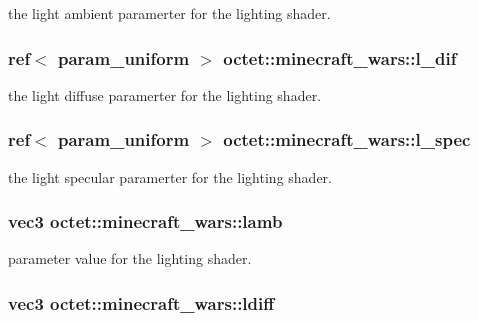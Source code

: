 the light ambient paramerter for the lighting shader. 

\hypertarget{classoctet_1_1minecraft__wars_ac4e627b56678402ff9581a24725d17c0}{
\subsubsection[{l\+\_\+dif}]{\setlength{\rightskip}{0pt plus 5cm}ref$<$ param\+\_\+uniform $>$ octet\+::minecraft\+\_\+wars\+::l\+\_\+dif\hspace{0.3cm}{\ttfamily [private]}}}\label{classoctet_1_1minecraft__wars_ac4e627b56678402ff9581a24725d17c0}


the light diffuse paramerter for the lighting shader. 

\hypertarget{classoctet_1_1minecraft__wars_a6ef89c983e9b97bb1569a6962cb5417f}{
\subsubsection[{l\+\_\+spec}]{\setlength{\rightskip}{0pt plus 5cm}ref$<$ param\+\_\+uniform $>$ octet\+::minecraft\+\_\+wars\+::l\+\_\+spec\hspace{0.3cm}{\ttfamily [private]}}}\label{classoctet_1_1minecraft__wars_a6ef89c983e9b97bb1569a6962cb5417f}


the light specular paramerter for the lighting shader. 

\hypertarget{classoctet_1_1minecraft__wars_a6b8b4cc7893ab6f361694de9d26d6336}{
\subsubsection[{lamb}]{\setlength{\rightskip}{0pt plus 5cm}vec3 octet\+::minecraft\+\_\+wars\+::lamb\hspace{0.3cm}{\ttfamily [private]}}}\label{classoctet_1_1minecraft__wars_a6b8b4cc7893ab6f361694de9d26d6336}


parameter value for the lighting shader. 

\hypertarget{classoctet_1_1minecraft__wars_a8031b4e5055a0ae1a9ffe67a2cf4d168}{
\subsubsection[{ldiff}]{\setlength{\rightskip}{0pt plus 5cm}vec3 octet\+::minecraft\+\_\+wars\+::ldiff\hspace{0.3cm}{\ttfamily [private]}}}\label{classoctet_1_1minecraft__wars_a8031b4e5055a0ae1a9ffe67a2cf4d168}


